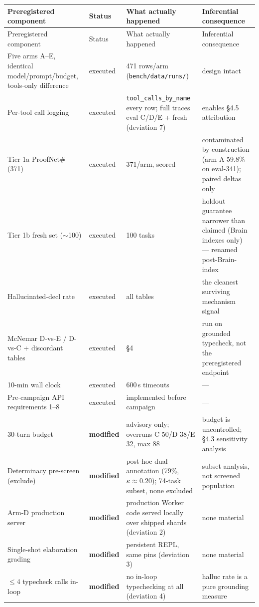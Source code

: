 \documentclass[10pt]{article}
\newcommand{\code}[1]{\texttt{#1}}
\begin{document}
{\footnotesize
\setlength{\tabcolsep}{4pt}
\begin{longtable}{@{}p{}p{}p{}p{}@{}}
\toprule
Preregistered component & Status & What actually happened & Inferential consequence \\
\midrule
\endfirsthead
\toprule
Preregistered component & Status & What actually happened & Inferential consequence \\
\midrule
\endhead
\bottomrule
\endfoot
\bottomrule
\endlastfoot
Five arms A--E, identical model/prompt/budget, tools-only difference & executed & 471 rows/arm (\code{bench/data/runs/}) & design intact \\
Per-tool call logging & executed & \code{tool\_calls\_by\_name} every row; full traces eval C/D/E + fresh (deviation 7) & enables \S4.5 attribution \\
Tier 1a ProofNet\# (371) & executed & 371/arm, scored & contaminated by construction (arm A 59.8\% on eval-341); paired deltas only \\
Tier 1b fresh set (${\sim}$100) & executed & 100 tasks & holdout guarantee narrower than claimed (Brain indexes only) --- renamed post-Brain-index \\
Hallucinated-decl rate & executed & all tables & the cleanest surviving mechanism signal \\
McNemar D-vs-E / D-vs-C + discordant tables & executed & \S4 & run on grounded typecheck, not the preregistered endpoint \\
10-min wall clock & executed & 600\,s timeouts & --- \\
Pre-campaign API requirements 1--8 & executed & implemented before campaign & --- \\
30-turn budget & \textbf{modified} & advisory only; overruns C 50/D 38/E 32, max 88 & budget is uncontrolled; \S4.3 sensitivity analysis \\
Determinacy pre-screen (exclude) & \textbf{modified} & post-hoc dual annotation (79\%, $\kappa\approx0.20$); 74-task subset, none excluded & subset analysis, not screened population \\
Arm-D production server & \textbf{modified} & production Worker code served locally over shipped shards (deviation 2) & none material \\
Single-shot elaboration grading & \textbf{modified} & persistent REPL, same pins (deviation 3) & none material \\
$\leq$4 typecheck calls in-loop & \textbf{modified} & no in-loop typechecking at all (deviation 4) & halluc rate is a pure grounding measure \\

\end{longtable}}
\end{document}

